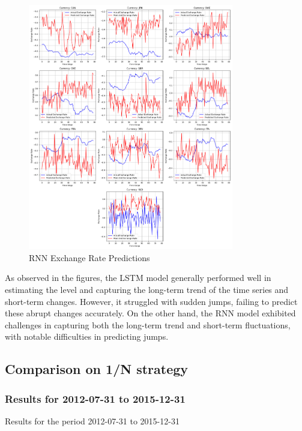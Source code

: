 \documentclass[a4paper,10pt]{article}
\begin{document}
\begin{figure}[ht]
    \centering
    \includegraphics[width=0.8\textwidth]{figure/rnn_exchange_rate_predictions.png}
    \caption{RNN Exchange Rate Predictions}
    \label{figure:rnn_predictions}
\end{figure}

As observed in the figures, the LSTM model generally performed well in estimating the level and capturing the long-term trend of the time series and short-term changes. However, it struggled with sudden jumps, failing to predict these abrupt changes accurately. On the other hand, the RNN model exhibited challenges in capturing both the long-term trend and short-term fluctuations, with notable difficulties in predicting jumps.

\clearpage  %

\subsection{Comparison on 1/N strategy}

\subsubsection{Results for 2012-07-31 to 2015-12-31}

\begin{table}[h]
  \centering
  \caption{Results for the period 2012-07-31 to 2015-12-31}
  \label{tab:results_2012-07-31_2015-12-31}
\end{table}
\end{document}
